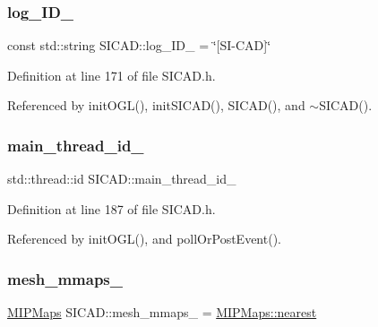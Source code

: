 \mbox{\label{classSICAD_a9eb34b659cac13b8442ca821455cc1f1}} 
\subsubsection{\texorpdfstring{log\+\_\+\+I\+D\+\_\+}{log\_ID\_}}
{\footnotesize\ttfamily const std\+::string S\+I\+C\+A\+D\+::log\+\_\+\+I\+D\+\_\+ = \char`\"{}\mbox{[}SI-\/C\+AD\mbox{]}\char`\"{}\hspace{0.3cm}{\ttfamily [private]}}



Definition at line 171 of file S\+I\+C\+A\+D.\+h.



Referenced by init\+O\+G\+L(), init\+S\+I\+C\+A\+D(), S\+I\+C\+A\+D(), and $\sim$\+S\+I\+C\+A\+D().

\mbox{\label{classSICAD_a6a4623d27b2ee48ad0db90bd075c708c}} 
\subsubsection{\texorpdfstring{main\+\_\+thread\+\_\+id\+\_\+}{main\_thread\_id\_}}
{\footnotesize\ttfamily std\+::thread\+::id S\+I\+C\+A\+D\+::main\+\_\+thread\+\_\+id\+\_\+\hspace{0.3cm}{\ttfamily [private]}}



Definition at line 187 of file S\+I\+C\+A\+D.\+h.



Referenced by init\+O\+G\+L(), and poll\+Or\+Post\+Event().

\mbox{\label{classSICAD_a34b0de96321855145937cc5858c019b0}} 
\subsubsection{\texorpdfstring{mesh\+\_\+mmaps\+\_\+}{mesh\_mmaps\_}}
{\footnotesize\ttfamily \mbox{\hyperlink{classSICAD_a7e092dede6f660355462d6d548214198}{M\+I\+P\+Maps}} S\+I\+C\+A\+D\+::mesh\+\_\+mmaps\+\_\+ = \mbox{\hyperlink{classSICAD_a7e092dede6f660355462d6d548214198ad879c351426770bc0b13c3628db1e636}{M\+I\+P\+Maps\+::nearest}}\hspace{0.3cm}{\ttfamily [private]}}



